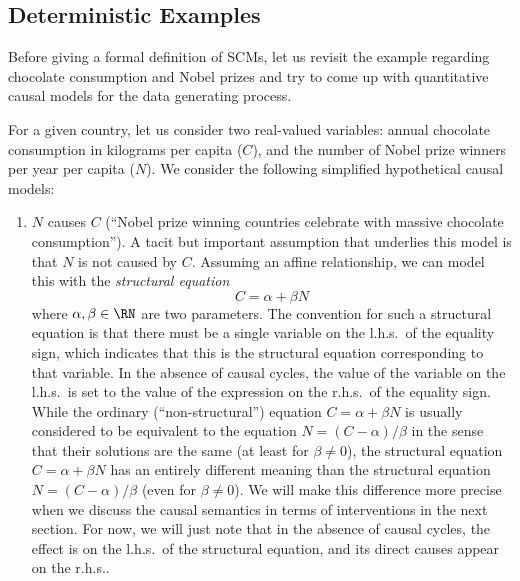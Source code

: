 \subsection{Deterministic Examples}\label{sec:deterministic_scms}

Before giving a formal definition of SCMs, let us revisit the example regarding chocolate consumption and Nobel prizes
and try to come up with quantitative causal models for the data generating process.

For a given country, let us consider two real-valued variables: annual chocolate consumption in kilograms per capita ($C$), and the number of Nobel prize winners per year per capita ($N$). We consider the following simplified hypothetical causal models:
\begin{enumerate}[label=(\roman*)]
  \item $N$ causes $C$ (``Nobel prize winning countries celebrate with massive chocolate consumption''). 
    A tacit but important assumption that underlies this model is that $N$ is not caused by $C$. 
    Assuming an affine relationship, we can model this with the \emph{structural equation}
    \begin{equation}\label{eq:scm_N_causes_C}
    C = \alpha + \beta N
    \end{equation}
    where $\alpha, \beta \in \RN$ are two parameters.
    The convention for such a structural equation is that there must be a single variable on the l.h.s.\ of the equality sign, which indicates that this is the structural equation corresponding to that variable. In the absence of causal cycles,
    the value of the variable on the l.h.s.\ is set to the value of the expression on the r.h.s.\ of the equality sign.
    While the ordinary (``non-structural'') equation $C = \alpha + \beta N$ is usually considered to be equivalent to the equation $N = (C - \alpha) / \beta$ in the sense that their solutions are the same (at least for $\beta \ne 0$), the structural equation $C = \alpha + \beta N$ has an entirely different meaning than the structural equation $N = (C - \alpha) / \beta$ (even for $\beta \ne 0$).
    We will make this difference more precise when we discuss the causal semantics in terms of interventions in the next section.
    For now, we will just note that in the absence of causal cycles, the effect is on the l.h.s.\ of the structural equation, and its direct causes appear on the r.h.s..


\end{enumerate}
